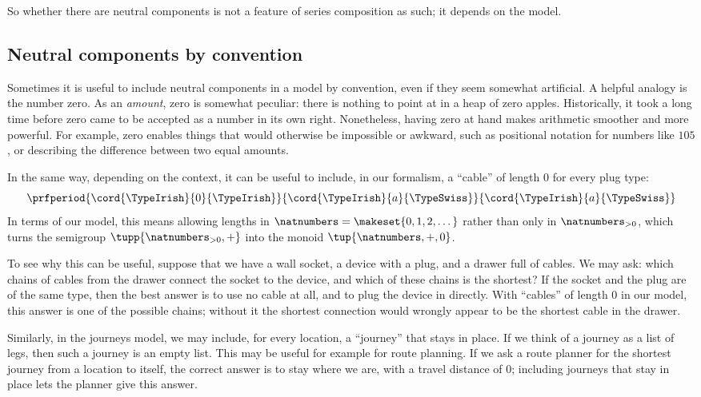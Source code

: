 \medskip
So whether there are neutral components is not a feature of series composition as such; it depends on the model.

\subsection{Neutral components by convention}

Sometimes it is useful to include neutral components in a model by convention, even if they seem somewhat artificial. A helpful analogy is the number zero. As an \emph{amount}, zero is somewhat peculiar: there is nothing to point at in a heap of zero apples. Historically, it took a long time before zero came to be accepted as a number in its own right. Nonetheless, having zero at hand makes arithmetic smoother and more powerful. For example, zero enables things that would otherwise be impossible or awkward, such as positional notation for numbers like $105$, or describing the difference between two equal amounts.

In the same way, depending on the context, it can be useful to include, in our formalism, a ``cable'' of length $0$ for every plug type:
\begin{equation}
    \label{eq:neutral-cable}
    \prfperiod{
        \cord{\TypeIrish}{0}{\TypeIrish}
    }{
        \cord{\TypeIrish}{a}{\TypeSwiss}
    }{
        \cord{\TypeIrish}{a}{\TypeSwiss}
    }
\end{equation}
In terms of our model, this means allowing lengths in $\natnumbers = \makeset{0, 1, 2, \dots}$ rather than only in $\natnumbers_{>0}$, which turns the semigroup $\tupp{\natnumbers_{>0},+}$ into the monoid $\tup{\natnumbers, +, 0}$.

To see why this can be useful, suppose that we have a wall socket, a device with a plug, and a drawer full of cables. We may ask: which chains of cables from the drawer connect the socket to the device, and which of these chains is the shortest? If the socket and the plug are of the same type, then the best answer is to use no cable at all, and to plug the device in directly. With ``cables'' of length $0$ in our model, this answer is one of the possible chains; without it the shortest connection would wrongly appear to be the shortest cable in the drawer.

Similarly, in the journeys model, we may include, for every location, a ``journey'' that stays in place. If we think of a journey as a list of legs, then such a journey is an empty list. This may be useful for example for route planning. If we ask a route planner for the shortest journey from a location to itself, the correct answer is to stay where we are, with a travel distance of $0$; including journeys that stay in place lets the planner give this answer. 


